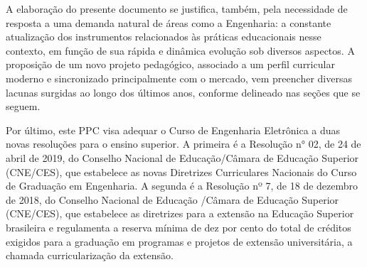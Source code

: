 A elaboração do presente documento se justifica, também, pela necessidade de resposta a uma demanda natural de áreas como a Engenharia: a constante atualização dos instrumentos relacionados às práticas educacionais nesse contexto, em função de sua rápida e dinâmica evolução sob diversos aspectos. A proposição de um novo projeto pedagógico, associado a um perfil curricular moderno e sincronizado principalmente com o mercado, vem preencher diversas lacunas surgidas ao longo dos últimos anos, conforme delineado nas seções que se seguem.

Por último, este PPC visa adequar o Curso de Engenharia Eletrônica a duas novas resoluções para o ensino superior. A primeira é a Resolução n° 02, de 24 de abril de 2019, do Conselho Nacional de Educação/Câmara de Educação Superior (CNE/CES), que estabelece as novas Diretrizes Curriculares Nacionais do Curso de Graduação em Engenharia. A segunda é a Resolução nº 7, de 18 de dezembro de 2018, do Conselho Nacional de Educação /Câmara de Educação Superior (CNE/CES), que estabelece as diretrizes para a extensão na Educação Superior brasileira e regulamenta a reserva mínima de dez por cento do total de créditos exigidos para a graduação em programas e projetos de extensão universitária, a chamada curricularização da extensão.
